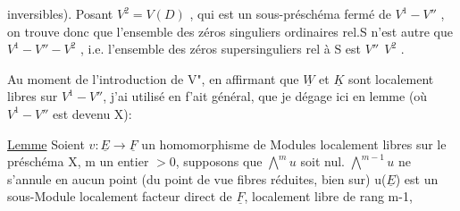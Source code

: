 
inversibles). Posant $V^2 = V(D)$ , qui est un sous-préschéma fermé de
$V^1-V''$ , on trouve donc que l'ensemble des  zéros singuliers
ordinaires rel.S n'est autre que $V^1 - V'' - V^2$ , i.e. l'ensemble des
zéros supersinguliers  rel à S est $V''\ \ V^2$ .

 Au moment de l'introduction de V", en affirmant que $\underline{W}$ et $\underline{K}$ sont
localement libres sur $V^1-V''$, j'ai utilisé en f'ait général, que je dégage
ici en lemme (où $V^1-V''$ est devenu X):

\uline{Lemme} Soient $v\colon \underline{E} \to \underline{F}$ un homomorphisme de Modules localement libres
sur le préschéma X,  m un entier $>0$, supposons que $\bigwedge^{m} u$ soit
nul.  
$\bigwedge^{m-1} u$ ne s'annule en aucun point (du point de vue fibres réduites, bien
sur)   u($\underline{E}$) est un sous-Module localement facteur direct de $\underline{F}$,
localement libre de rang m-1, 

